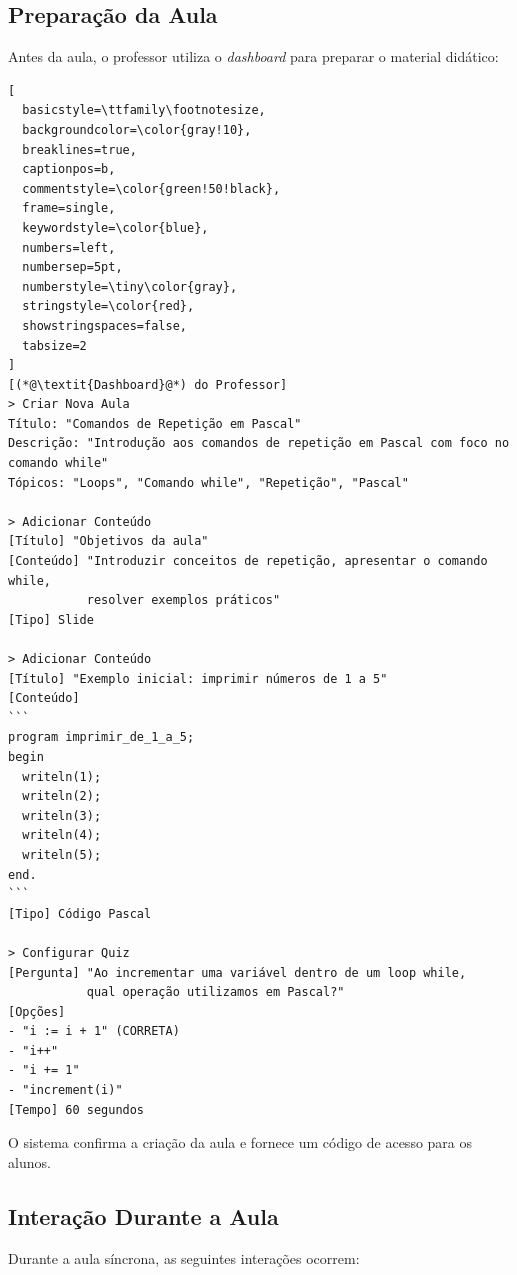 \subsection{Preparação da Aula}
\label{subsec:preparacao}

Antes da aula, o professor utiliza o \textit{dashboard} para preparar o material
didático:

\begin{lstlisting}[
  basicstyle=\ttfamily\footnotesize,
  backgroundcolor=\color{gray!10},
  breaklines=true,
  captionpos=b,
  commentstyle=\color{green!50!black},
  frame=single,
  keywordstyle=\color{blue},
  numbers=left,
  numbersep=5pt,
  numberstyle=\tiny\color{gray},
  stringstyle=\color{red},
  showstringspaces=false,
  tabsize=2
]
[(*@\textit{Dashboard}@*) do Professor]
> Criar Nova Aula
Título: "Comandos de Repetição em Pascal"
Descrição: "Introdução aos comandos de repetição em Pascal com foco no comando while"
Tópicos: "Loops", "Comando while", "Repetição", "Pascal"

> Adicionar Conteúdo
[Título] "Objetivos da aula"
[Conteúdo] "Introduzir conceitos de repetição, apresentar o comando while, 
           resolver exemplos práticos"
[Tipo] Slide

> Adicionar Conteúdo
[Título] "Exemplo inicial: imprimir números de 1 a 5"
[Conteúdo] 
```
program imprimir_de_1_a_5;
begin
  writeln(1);
  writeln(2);
  writeln(3);
  writeln(4);
  writeln(5);
end.
```
[Tipo] Código Pascal

> Configurar Quiz
[Pergunta] "Ao incrementar uma variável dentro de um loop while, 
           qual operação utilizamos em Pascal?"
[Opções] 
- "i := i + 1" (CORRETA)
- "i++"
- "i += 1"
- "increment(i)"
[Tempo] 60 segundos
\end{lstlisting}

O sistema confirma a criação da aula e fornece um código de acesso para os alunos.

\subsection{Interação Durante a Aula}
\label{subsec:interacao}

Durante a aula síncrona, as seguintes interações ocorrem:

